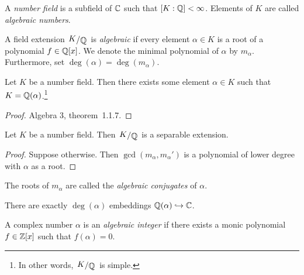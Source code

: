 
\begin{definicija}
A \emph{number field} is a subfield of $\mathbb{C}$
such that $[K : \mathbb{Q}] < \infty$. Elements of $K$ are called
\emph{algebraic numbers}.
\end{definicija}

\begin{definicija}
A field extension $\kvoc{K}{\Q}$ is
\emph{algebraic} if every element
$\alpha \in K$ is a root of a polynomial $f \in \mathbb{Q}[x]$. We denote
the minimal polynomial of $\alpha$ by $m_\alpha$. Furthermore, set
$\deg(\alpha) = \deg(m_\alpha)$.
\end{definicija}

\begin{izrek}
Let $K$ be a number field. Then there exists some element
$\alpha \in K$ such that $K = \mathbb{Q}(\alpha)$.\footnote{In other words,
$\kvoc{K}{\Q}$ is simple.}
\end{izrek}

\begin{proof}
Algebra 3, theorem~1.1.7.
\end{proof}

\begin{trditev}
Let $K$ be a number field. Then $\kvoc{K}{\Q}$ is a separable
extension.
\end{trditev}

\begin{proof}
Suppose otherwise. Then $\gcd(m_\alpha, m_\alpha')$ is a polynomial
of lower degree with $\alpha$ as a root.
\end{proof}

\begin{opomba}
The roots of $m_\alpha$ are called the
\emph{algebraic conjugates} of $\alpha$.
\end{opomba}

\begin{posledica}
There are exactly $\deg(\alpha)$ embeddings
$\mathbb{Q}(\alpha) \hookrightarrow \mathbb{C}$.
\end{posledica}

\begin{definicija}
A complex number $\alpha$ is an
\emph{algebraic integer} if there exists a
monic polynomial $f \in \mathbb{Z}[x]$ such that $f(\alpha) = 0$.
\end{definicija}


